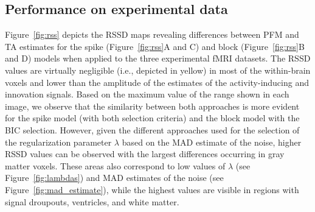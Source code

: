
\subsection{Performance on experimental data}

Figure~\ref{fig:rss} depicts the RSSD maps revealing differences between PFM and TA estimates for the spike (Figure~\ref{fig:rss}A and C) and block (Figure~\ref{fig:rss}B and D) models when applied to the three experimental fMRI datasets. The RSSD values are virtually negligible (i.e., depicted in yellow) in most of the within-brain voxels and lower than the amplitude of the estimates of the activity-inducing and innovation signals. Based on the maximum value of the range shown in each image, we observe that the similarity between both approaches is more evident for the spike model (with both selection criteria) and the block model with the BIC selection. However, given the different approaches used for the selection of the regularization parameter $\lambda$ based on the MAD estimate of the noise, higher RSSD values can be observed with the largest differences occurring in gray matter voxels. These areas also correspond to low values of $\lambda$ (see Figure~\ref{fig:lambdas}) and MAD estimates of the noise (see Figure~\ref{fig:mad_estimate}), while the highest values are visible in regions with signal droupouts, ventricles, and white matter.


